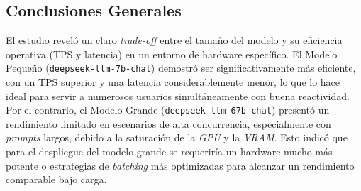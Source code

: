 \subsection*{Conclusiones Generales}
El estudio reveló un claro \textit{trade-off} entre el tamaño del modelo y su eficiencia operativa (TPS y latencia) en un entorno de hardware específico. El Modelo Pequeño (\texttt{deepseek-llm-7b-chat}) demostró ser significativamente más eficiente, con un TPS superior y una latencia considerablemente menor, lo que lo hace ideal para servir a numerosos usuarios simultáneamente con buena reactividad. Por el contrario, el Modelo Grande (\texttt{deepseek-llm-67b-chat}) presentó un rendimiento limitado en escenarios de alta concurrencia, especialmente con \textit{prompts} largos, debido a la saturación de la \textit{GPU} y la \textit{VRAM}. Esto indicó que para el despliegue del modelo grande se requeriría un hardware mucho más potente o estrategias de \textit{batching} más optimizadas para alcanzar un rendimiento comparable bajo carga.

